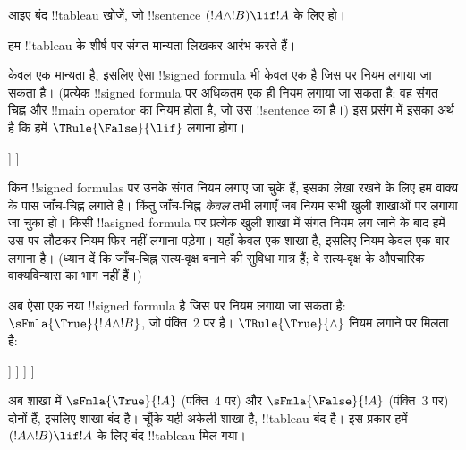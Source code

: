 \documentclass[../../../include/open-logic-section]{subfiles}
\begin{document}
      {}
      {}


\begin{ex}
आइए बंद !!{tableau} खोजें, जो !!{sentence} $(!A \land !B) \lif !A$ के
लिए हो।

हम !!{tableau} के शीर्ष पर संगत मान्यता लिखकर आरंभ करते हैं।
\begin{oltableau}
  [\sFmla{\False}{(\formula{A} \land \formula{B}) \lif \formula{A}},
    just = \TAss]
\end{oltableau}

केवल एक मान्यता है, इसलिए ऐसा !!{signed formula} भी केवल एक है जिस पर नियम
लगाया जा सकता है। (प्रत्येक !!{signed formula} पर अधिकतम एक ही नियम लगाया
जा सकता है: वह संगत चिह्न और !!{main operator} का नियम होता है, जो उस
!!{sentence} का है।) इस प्रसंग में इसका अर्थ है कि हमें
$\TRule{\False}{\lif}$ लगाना होगा।
\begin{oltableau}
  [\sFmla{\False}{(\formula{A} \land \formula{B}) \lif \formula{A}},
    checked, just = \TAss
    [\sFmla{\True}{\formula{A} \land \formula{B}},
      just={\TRule{\False}{\lif}[1]}
      [\sFmla{\False}{\formula{A}}, just={\TRule{\False}{\lif}[1]}]
    ]
  ]
\end{oltableau}
किन !!{signed formula}s पर उनके संगत नियम लगाए जा चुके हैं, इसका लेखा रखने
के लिए हम वाक्य के पास जाँच-चिह्न लगाते हैं। किंतु जाँच-चिह्न \emph{केवल}
तभी लगाएँ जब नियम सभी खुली शाखाओं पर लगाया जा चुका हो। किसी
!!a{signed formula} पर प्रत्येक खुली शाखा में संगत नियम लग जाने के बाद हमें
उस पर लौटकर नियम फिर नहीं लगाना पड़ेगा। यहाँ केवल एक शाखा है, इसलिए नियम
केवल एक बार लगाना है। (ध्यान दें कि जाँच-चिह्न सत्य-वृक्ष बनाने की सुविधा
मात्र हैं; वे सत्य-वृक्ष के औपचारिक वाक्यविन्यास का भाग नहीं हैं।)

अब ऐसा एक नया !!{signed formula} है जिस पर नियम लगाया जा सकता है:
$\sFmla{\True}{!A \land !B}$, जो पंक्ति~$2$ पर है।
$\TRule{\True}{\land}$ नियम लगाने पर मिलता है:
\begin{oltableau}
  [\sFmla{\False}{(\formula{A} \land \formula{B}) \lif \formula{A}},
    checked, just = \TAss
    [\sFmla{\True}{\formula{A} \land \formula{B}},
      just={\TRule{\False}{\lif}[1]}, checked
      [\sFmla{\False}{\formula{A}}, just={\TRule{\False}{\lif}[1]}
        [\sFmla{\True}{\formula{A}}, just={\TRule{\True}{\land}[2]}
          [\sFmla{\True}{\formula{B}}, just={\TRule{\True}{\land}[2]}, close
          ]
        ]
      ]
    ]
  ]
\end{oltableau}
अब शाखा में $\sFmla{\True}{!A}$ (पंक्ति~$4$ पर) और
$\sFmla{\False}{!A}$ (पंक्ति~$3$ पर) दोनों हैं, इसलिए शाखा बंद है। चूँकि
यही अकेली शाखा है, !!{tableau} बंद है। इस प्रकार हमें
~$(!A \land !B) \lif !A$ के लिए बंद !!{tableau} मिल गया।
\end{ex}
\end{document}
